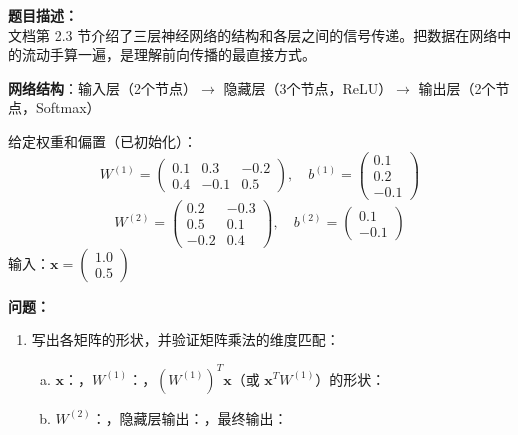 \documentclass[a4paper,11pt]{ctexart}
\begin{document}
\begin{problembox}
    \textbf{题目描述：}\\
    文档第 2.3 节介绍了三层神经网络的结构和各层之间的信号传递。把数据在网络中的流动手算一遍，是理解前向传播的最直接方式。

    \vspace{0.3cm}
    \textbf{网络结构}：输入层（2个节点）$\to$ 隐藏层（3个节点，ReLU）$\to$ 输出层（2个节点，Softmax）

    \vspace{0.3cm}
    给定权重和偏置（已初始化）：
    \[
    W^{(1)} = \begin{pmatrix} 0.1 & 0.3 & -0.2 \\ 0.4 & -0.1 & 0.5 \end{pmatrix},\quad
    b^{(1)} = \begin{pmatrix} 0.1 \\ 0.2 \\ -0.1 \end{pmatrix}
    \]
    \[
    W^{(2)} = \begin{pmatrix} 0.2 & -0.3 \\ 0.5 & 0.1 \\ -0.2 & 0.4 \end{pmatrix},\quad
    b^{(2)} = \begin{pmatrix} 0.1 \\ -0.1 \end{pmatrix}
    \]
    输入：$\mathbf{x} = \begin{pmatrix} 1.0 \\ 0.5 \end{pmatrix}$

    \vspace{0.3cm}
    \textbf{问题：}
    \begin{enumerate}[(1)]
        \item 写出各矩阵的形状，并验证矩阵乘法的维度匹配：
        \begin{enumerate}[a.]
            \item $\mathbf{x}$：\underline{\hspace{2cm}}，$W^{(1)}$：\underline{\hspace{2cm}}，$(W^{(1)})^T \mathbf{x}$（或 $\mathbf{x}^T W^{(1)}$）的形状：\underline{\hspace{2cm}}
            \item $W^{(2)}$：\underline{\hspace{2cm}}，隐藏层输出：\underline{\hspace{2cm}}，最终输出：\underline{\hspace{2cm}}
        \end{enumerate}


\end{enumerate}
\end{problembox}
\end{document}
